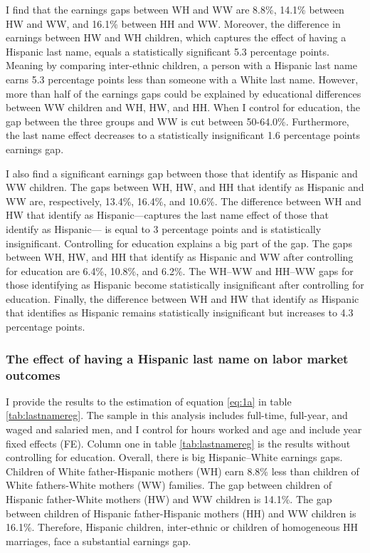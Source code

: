 \documentclass[12pt, fullpage]{article}
\begin{document}
I find that the earnings gaps between WH and WW are 8.8\%, 14.1\% between HW and WW, and 16.1\% between HH and WW. Moreover, the difference in earnings between HW and WH children, which captures the effect of having a Hispanic last name, equals a statistically significant 5.3 percentage points. Meaning by comparing inter-ethnic children, a person with a Hispanic last name earns 5.3 percentage points less than someone with a White last name. However, more than half of the earnings gaps could be explained by educational differences between WW children and WH, HW, and HH. When I control for education, the gap between the three groups and WW is cut between 50-64.0\%. Furthermore, the last name effect decreases to a statistically insignificant 1.6 percentage points earnings gap.

I also find a significant earnings gap between those that identify as Hispanic and WW children. The gaps between WH, HW, and HH that identify as Hispanic and WW are, respectively, 13.4\%, 16.4\%, and 10.6\%. The difference between WH and HW that identify as Hispanic---captures the last name effect of those that identify as Hispanic--- is equal to 3 percentage points and is statistically insignificant. Controlling for education explains a big part of the gap. The gaps between WH, HW, and HH that identify as Hispanic and WW after controlling for education are 6.4\%, 10.8\%, and 6.2\%. The WH--WW and HH--WW gaps for those identifying as Hispanic become statistically insignificant after controlling for education. Finally, the difference between WH and HW that identify as Hispanic that identifies as Hispanic remains statistically insignificant but increases to 4.3 percentage points.

\subsubsection{The effect of having a Hispanic last name on labor market outcomes}

I provide the results to the estimation of equation \ref{eq:1a} in table \ref{tab:lastnamereg}. The sample in this analysis includes full-time, full-year, and waged and salaried men, and I control for hours worked and age and include year fixed effects (FE). Column one in table \ref{tab:lastnamereg} is the results without controlling for education. Overall, there is big Hispanic--White earnings gaps. Children of White father-Hispanic mothers (WH) earn 8.8\% less than children of White fathers-White mothers (WW) families. The gap between children of Hispanic father-White mothers (HW) and WW children is 14.1\%. The gap between children of Hispanic father-Hispanic mothers (HH) and WW children is 16.1\%. Therefore, Hispanic children, inter-ethnic or children of homogeneous HH marriages, face a substantial earnings gap.
\end{document}
